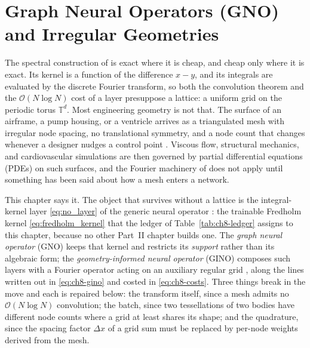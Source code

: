 
\chapter{Graph Neural Operators (GNO) and Irregular Geometries}
\label{ch:part2-graph-neural-operators-gno-and-irregular-g}
\label{sec:gno}

The spectral construction of  is
exact where it is cheap, and cheap only where it is exact. Its kernel is a function of the
difference $x-y$, and its integrals are evaluated by the discrete Fourier transform, so both
the convolution theorem and the $\mathcal{O}(N \log N)$ cost of a layer presuppose a lattice:
a uniform grid on the periodic torus $\mathbb{T}^{d}$. Most engineering geometry is not that.
The surface of an airframe, a pump housing, or a ventricle arrives as a triangulated mesh with
irregular node spacing, no translational symmetry, and a node count that changes whenever a
designer nudges a control point
.
Viscous flow, structural mechanics, and cardiovascular simulations are then governed by
partial differential equations (PDEs) on such surfaces, and the Fourier machinery of
 does not apply until something
has been said about how a mesh enters a network.

This chapter says it. The object that survives without a lattice is the integral-kernel layer
\eqref{eq:no_layer} of the generic neural operator \cite{kovachki2023neural}: the trainable
Fredholm kernel \eqref{eq:fredholm_kernel} that the ledger of
Table~\ref{tab:ch8-ledger} assigns to
this chapter, because no other Part~II chapter builds one. The \emph{graph neural operator} (GNO)
keeps that kernel and restricts its \emph{support} rather than its algebraic form; the
\emph{geometry-informed neural operator} (GINO) composes such layers with a Fourier operator
acting on an auxiliary regular grid \cite{li2023geometry}, along the lines written out in
\eqref{eq:ch8-gino} and costed in \eqref{eq:ch8-costs}. Three things break in the move and
each is repaired below: the transform itself, since a mesh admits no $\mathcal{O}(N \log N)$
convolution; the batch, since two tessellations of two bodies have different node counts where
a grid at least shares its shape; and the quadrature, since the spacing factor $\Delta x$ of a
grid sum must be replaced by per-node weights derived from the mesh.

